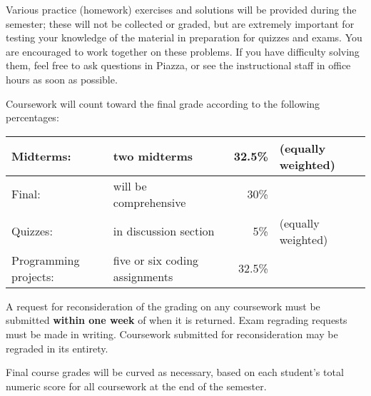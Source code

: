 \documentclass[10pt]{article}
\begin{document}
    Various practice (homework) exercises and solutions will be provided
  during the semester; these will not be collected or graded, but are
  extremely important for testing your knowledge of the material in
  preparation for quizzes and exams.  You are encouraged to work together on
  these problems.  If you have difficulty solving them, feel free to ask
  questions in Piazza, or see the instructional staff in office hours as
  soon as possible.

    \smallskip

    Coursework will count toward the final grade according to the following
  percentages:

    \begin{center}

      \begin{tabular}{@{}|l|l|r|l|@{}}

        \hline

        Midterms:
          & two midterms
          & 32.5\%
          & (equally weighted)
          \\ \hline

        Final:
          & will be comprehensive
          & 30\%
          &
          \\ \hline

        Quizzes:
          & in discussion section
          & 5\%
          & (equally weighted)
          \\ \hline

        Programming projects:
          & five or six coding assignments
          & 32.5\%
          &
          \\ \hline

      \end{tabular}

    \end{center}

    \smallskip

    A request for reconsideration of the grading on any coursework must be
  submitted \textbf{within one week} of when it is returned.  Exam regrading
  requests must be made in writing.
  Coursework submitted for reconsideration may be regraded in its entirety.

    Final course grades will be curved as necessary, based on each student's
  total numeric score for all coursework at the end of the semester.
\end{document}
